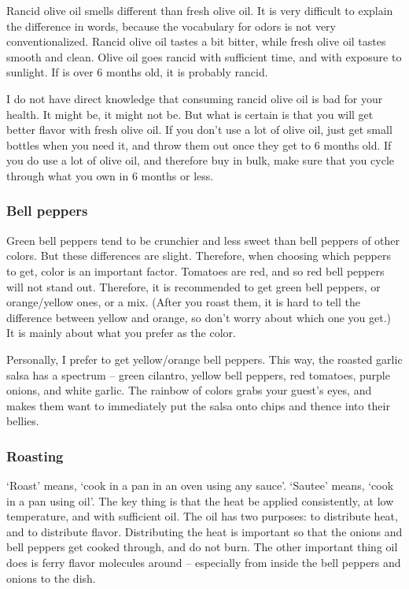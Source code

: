Rancid olive oil smells different than fresh olive oil. It is very difficult to explain the difference in words, because the vocabulary for odors is not very conventionalized. Rancid olive oil tastes a bit bitter, while fresh olive oil tastes smooth and clean. Olive oil goes rancid with sufficient time, and with exposure to sunlight. If is over 6 months old, it is probably rancid.

I do not have direct knowledge that consuming rancid olive oil is bad for your health. It might be, it might not be. But what is certain is that you will get better flavor with fresh olive oil. If you don't use a lot of olive oil, just get small bottles when you need it, and throw them out once they get to 6 months old. If you do use a lot of olive oil, and therefore buy in bulk, make sure that you cycle through what you own in 6 months or less.

\subsubsection{Bell peppers}

Green bell peppers tend to be crunchier and less sweet than bell peppers of other colors. But these differences are slight. Therefore, when choosing which peppers to get, color is an important factor. Tomatoes are red, and so red bell peppers will not stand out. Therefore, it is recommended to get green bell peppers, or orange/yellow ones, or a mix. (After you roast them, it is hard to tell the difference between yellow and orange, so don't worry about which one you get.) It is mainly about what you prefer as the color.

Personally, I prefer to get yellow/orange bell peppers. This way, the roasted garlic salsa has a spectrum -- green cilantro, yellow bell peppers, red tomatoes, purple onions, and white garlic. The rainbow of colors grabs your guest's eyes, and makes them want to immediately put the salsa onto chips and thence into their bellies.

\subsubsection{Roasting}

`Roast' means, `cook in a pan in an oven using any sauce'. `Sautee' means, `cook in a pan using oil'. The key thing is that the heat be applied consistently, at low temperature, and with sufficient oil. The oil has two purposes: to distribute heat, and to distribute flavor. Distributing the heat is important so that the onions and bell peppers get cooked through, and do not burn. The other important thing oil does is ferry flavor molecules around -- especially from inside the bell peppers and onions to the dish.

